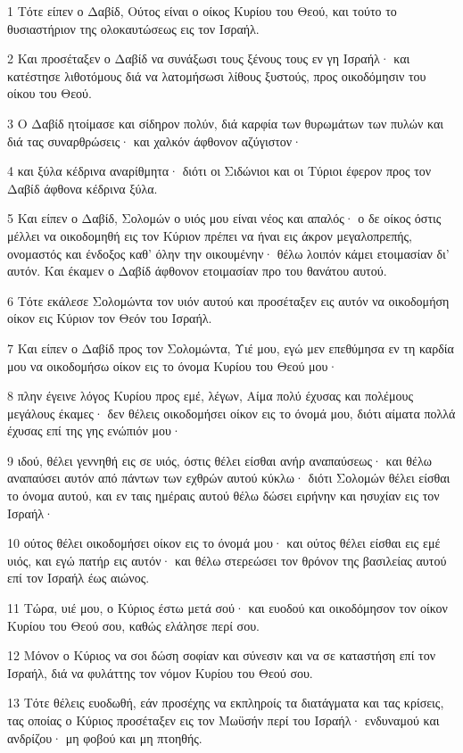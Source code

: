 \par 1 Τότε είπεν ο Δαβίδ, Ούτος είναι ο οίκος Κυρίου του Θεού, και τούτο το θυσιαστήριον της ολοκαυτώσεως εις τον Ισραήλ.
\par 2 Και προσέταξεν ο Δαβίδ να συνάξωσι τους ξένους τους εν γη Ισραήλ· και κατέστησε λιθοτόμους διά να λατομήσωσι λίθους ξυστούς, προς οικοδόμησιν του οίκου του Θεού.
\par 3 Ο Δαβίδ ητοίμασε και σίδηρον πολύν, διά καρφία των θυρωμάτων των πυλών και διά τας συναρθρώσεις· και χαλκόν άφθονον αζύγιστον·
\par 4 και ξύλα κέδρινα αναρίθμητα· διότι οι Σιδώνιοι και οι Τύριοι έφερον προς τον Δαβίδ άφθονα κέδρινα ξύλα.
\par 5 Και είπεν ο Δαβίδ, Σολομών ο υιός μου είναι νέος και απαλός· ο δε οίκος όστις μέλλει να οικοδομηθή εις τον Κύριον πρέπει να ήναι εις άκρον μεγαλοπρεπής, ονομαστός και ένδοξος καθ' όλην την οικουμένην· θέλω λοιπόν κάμει ετοιμασίαν δι' αυτόν. Και έκαμεν ο Δαβίδ άφθονον ετοιμασίαν προ του θανάτου αυτού.
\par 6 Τότε εκάλεσε Σολομώντα τον υιόν αυτού και προσέταξεν εις αυτόν να οικοδομήση οίκον εις Κύριον τον Θεόν του Ισραήλ.
\par 7 Και είπεν ο Δαβίδ προς τον Σολομώντα, Υιέ μου, εγώ μεν επεθύμησα εν τη καρδία μου να οικοδομήσω οίκον εις το όνομα Κυρίου του Θεού μου·
\par 8 πλην έγεινε λόγος Κυρίου προς εμέ, λέγων, Αίμα πολύ έχυσας και πολέμους μεγάλους έκαμες· δεν θέλεις οικοδομήσει οίκον εις το όνομά μου, διότι αίματα πολλά έχυσας επί της γης ενώπιόν μου·
\par 9 ιδού, θέλει γεννηθή εις σε υιός, όστις θέλει είσθαι ανήρ αναπαύσεως· και θέλω αναπαύσει αυτόν από πάντων των εχθρών αυτού κύκλω· διότι Σολομών θέλει είσθαι το όνομα αυτού, και εν ταις ημέραις αυτού θέλω δώσει ειρήνην και ησυχίαν εις τον Ισραήλ·
\par 10 ούτος θέλει οικοδομήσει οίκον εις το όνομά μου· και ούτος θέλει είσθαι εις εμέ υιός, και εγώ πατήρ εις αυτόν· και θέλω στερεώσει τον θρόνον της βασιλείας αυτού επί τον Ισραήλ έως αιώνος.
\par 11 Τώρα, υιέ μου, ο Κύριος έστω μετά σού· και ευοδού και οικοδόμησον τον οίκον Κυρίου του Θεού σου, καθώς ελάλησε περί σου.
\par 12 Μόνον ο Κύριος να σοι δώση σοφίαν και σύνεσιν και να σε καταστήση επί τον Ισραήλ, διά να φυλάττης τον νόμον Κυρίου του Θεού σου.
\par 13 Τότε θέλεις ευοδωθή, εάν προσέχης να εκπληροίς τα διατάγματα και τας κρίσεις, τας οποίας ο Κύριος προσέταξεν εις τον Μωϋσήν περί του Ισραήλ· ενδυναμού και ανδρίζου· μη φοβού και μη πτοηθής.

